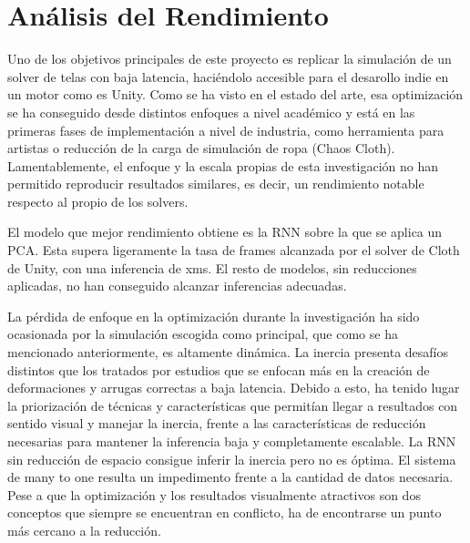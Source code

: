 \section{Análisis del Rendimiento}
\label{sec:Rendimiento}
Uno de los objetivos principales de este proyecto es replicar la simulación de un solver de telas con baja latencia, haciéndolo accesible para el desarollo indie en un motor como es Unity. Como se ha visto en el estado del arte, esa optimización se ha conseguido desde distintos enfoques a nivel académico y está en las primeras fases de implementación a nivel de industria, como herramienta para artistas o reducción de la carga de simulación de ropa (Chaos Cloth). Lamentablemente, el enfoque y la escala propias de esta investigación no han permitido reproducir resultados similares, es decir, un rendimiento notable respecto al propio de los solvers. \newline

El modelo que mejor rendimiento obtiene es la RNN sobre la que se aplica un PCA. Esta supera ligeramente la tasa de frames alcanzada por el solver de Cloth de Unity, con una inferencia de xms. El resto de modelos, sin reducciones aplicadas, no han conseguido alcanzar inferencias adecuadas.

La pérdida de enfoque en la optimización durante la investigación ha sido ocasionada por la simulación escogida como principal, que como se ha mencionado anteriormente, es altamente dinámica. La inercia presenta desafíos distintos que los tratados por estudios que se enfocan más en la creación de deformaciones y arrugas correctas a baja latencia. Debido a esto, ha tenido lugar la priorización de técnicas y características que permitían llegar a resultados con sentido visual y manejar la inercia, frente a las características de reducción necesarias para mantener la inferencia baja y completamente escalable. La RNN sin reducción de espacio consigue inferir la inercia pero no es óptima. El sistema de many to one resulta un impedimento frente a la cantidad de datos necesaria. Pese a que la optimización y los resultados visualmente atractivos son dos conceptos que siempre se encuentran en conflicto, ha de encontrarse un punto más cercano a la reducción.



